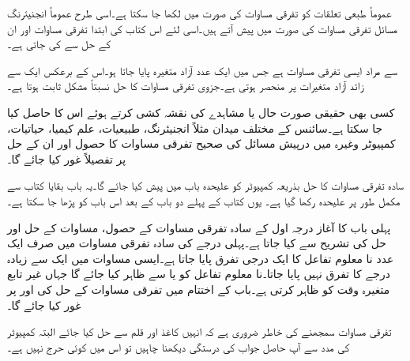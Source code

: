عموماً طبعی تعلقات کو تفرقی مساوات کی صورت میں لکھا جا سکتا ہے۔اسی طرح عموماً انجنیئرنگ مسائل تفرقی مساوات کی صورت میں پیش آتے ہیں۔اسی لئے  اس کتاب کی ابتدا تفرقی مساوات اور ان کے حل سے کی جاتی ہے۔

 سے مراد ایسی تفرقی مساوات ہے جس میں ایک عدد آزاد متغیرہ پایا جاتا ہو۔اس کے برعکس  ایک سے زائد آزاد متغیرات پر منحصر ہوتی ہے۔جزوی تفرقی مساوات کا حل نسبتاً مشکل ثابت ہوتا ہے۔

کسی بھی حقیقی صورت حال یا مشاہدے کی نقشہ کشی کرتے ہوئے  اس کا  حاصل کیا جا سکتا ہے۔سائنس کے مختلف میدان مثلاً انجنیئرنگ، طبیعیات، علم کیمیا، حیاتیات، کمپیوٹر وغیرہ میں درپیش مسائل کی صحیح تفرقی مساوات کا حصول اور ان کے حل پر تفصیلاً غور کیا جائے گا۔

سادہ تفرقی مساوات کا حل بذریعہ کمپیوٹر کو علیحدہ باب میں  پیش کیا جائے گا۔یہ باب بقایا کتاب سے مکمل طور پر علیحدہ رکھا گیا ہے۔ یوں کتاب کے پہلے  دو باب کے بعد اس باب کو پڑھا جا سکتا ہے۔

پہلی باب کا آغاز  درجہ اول کے سادہ تفرقی مساوات کے حصول، مساوات کے حل اور حل کی تشریح  سے کیا جاتا ہے۔پہلی درجے کی سادہ تفرقی مساوات میں صرف ایک عدد نا معلوم تفاعل کا ایک درجی تفرق پایا جاتا ہے۔ایسی مساوات میں ایک سے زیادہ درجے کا تفرق نہیں پایا جاتا۔نا معلوم تفاعل کو  یا  سے ظاہر کیا جائے گا جہاں غیر تابع متغیرہ    وقت کو ظاہر کرتی ہے۔باب کے اختتام میں تفرقی مساوات کے حل کی   اور  پر غور کیا جائے گا۔

تفرقی مساوات سمجھنے کی خاطر ضروری ہے کہ انہیں کاغذ اور قلم سے حل کیا جائے البتہ کمپیوٹر کی مدد سے آپ حاصل جواب کی درستگی دیکھنا چاہیں تو اس میں کوئی حرج نہیں ہے۔

